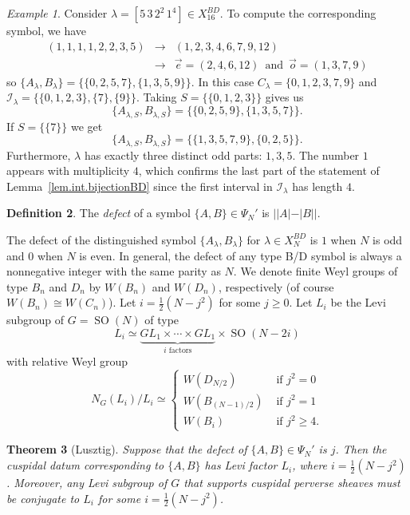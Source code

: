 \documentclass[reqno,11pt]{amsart}
\newtheorem{Thm}{Theorem}[section]
\theoremstyle{remark}
\theoremstyle{remark}
\newtheorem{example}[Thm]{Example}
\theoremstyle{definition}
\theoremstyle{definition}
\theoremstyle{definition}
\newtheorem{Def}[Thm]{Definition}
\numberwithin{equation}{section}
\newcommand{\SO}{\operatorname{SO}}
\newcommand{\ci}{\mathcal{I}}
\begin{document}
\begin{example}\label{ex.53221111} Consider $\lambda = [5\,3\,2^2\,1^4]\in X_{16}^{BD}$. To compute the corresponding symbol, we have
\begin{eqnarray*}
(1,1,1,1,2,2,3,5) &\longrightarrow& (1,2,3,4,6,7,9,12) \\
&\longrightarrow& \vec{e}=(2,4,6,12) \, \text{ and } \, \vec{o} = (1,3,7,9)
\end{eqnarray*}
so $\{A_\lambda, B_\lambda\} = \{\{0,2,5,7\}, \{1,3,5,9\}\}$. In this case $C_\lambda = \{0,1,2,3,7,9\}$ and $\ci_\lambda = \{\{0,1,2,3\},\{7\},\{9\}\}$.  Taking $S=\{\{0,1,2,3\}\}$ gives us 
\[
\{A_{\lambda,S}, B_{\lambda,S}\} = \{ \{0,2,5,9\},\{1,3,5,7\} \}.
\] 
If $S=\{\{7\}\}$ we get 
\[
\{A_{\lambda,S}, B_{\lambda,S}\} = \{\{1,3,5,7,9\}, \{0,2,5\}\}.
\]
Furthermore, $\lambda$ has exactly three distinct odd parts: $1, 3, 5$. The number $1$ appears with multiplicity $4$, which confirms the last part of the statement of Lemma~\ref{lem.int.bijectionBD} since the first interval in $\ci_\lambda$ has length $4$. 
\end{example}


\begin{Def} The \emph{defect} of a symbol $\{A, B\} \in \Psi_N'$ is $||A|-|B||$.
\end{Def}

The defect of the distinguished symbol $\{A_\lambda, B_\lambda\}$ for $\lambda\in X_N^{BD}$ is $1$ when $N$ is odd and $0$ when $N$ is even. In general, the defect of any type B/D symbol is always a nonnegative integer with the same parity as $N$. We denote finite Weyl groups of type $B_n$ and $D_n$ by $W(B_n)$ and $W(D_n)$, respectively (of course $W(B_n) \cong W(C_n)$).
Let $i=\frac{1}{2}(N-j^2)$ for some $j\geq 0$. Let  $L_i$ be the Levi subgroup of $G=\SO(N)$ of type
\begin{equation} \label{eqn:Li}
L_i \simeq \underbrace{GL_1\times \cdots \times GL_1}_{\text{$i$ factors}} \times \SO(N-2i)
\end{equation}
with relative Weyl group 
\[
N_G(L_i)/L_i \simeq \left\{\begin{array}{ll} W(D_{N/2}) & \text{ if $j^2=0$} \\ 
W(B_{(N-1)/2}) & \text{ if $j^2=1$} \\
W(B_i) & \text{ if $j^2\geq 4$}. \end{array} \right. 
\]



\begin{Thm}[Lusztig]\label{thm.Lusztig.TypeBD}
Suppose that the defect of $\{A,B\}\in \Psi_{N}'$ is $j$.  Then the cuspidal datum corresponding to $\{A,B\}$ has Levi factor $L_i$, where $i = \frac{1}{2}(N - j^2)$.  Moreover, any Levi subgroup of $G$ that supports cuspidal perverse sheaves must be conjugate
to $L_i$ for some $i = \frac{1}{2}(N - j^2)$.
\end{Thm}
\end{document}
